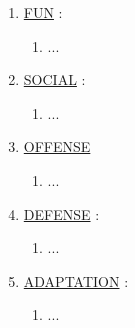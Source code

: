 \documentclass[11pt]{article}
\begin{document}
\begin{enumerate}
	\item[] \ul{FUN} :
	\begin{enumerate}
		\item[] ...
	\end{enumerate}

	\item[] \ul{SOCIAL} :
	\begin{enumerate}
		\item[] ...
	\end{enumerate}

	\item[] \ul{OFFENSE}
	\begin{enumerate}
		\item[] ...
	\end{enumerate}

	\item[] \ul{DEFENSE} :
	\begin{enumerate}
		\item[] ...
	\end{enumerate}

	\item[] \ul{ADAPTATION} :
	\begin{enumerate}
		\item[] ...
	\end{enumerate}

\end{enumerate}
\end{document}
